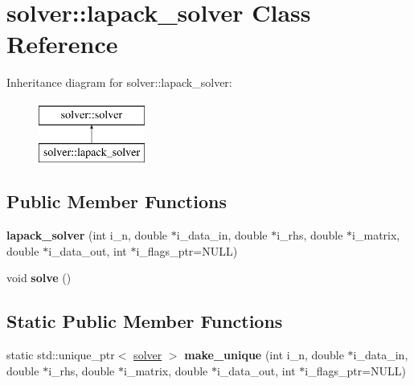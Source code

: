 \hypertarget{classsolver_1_1lapack__solver}{\section{solver\-:\-:lapack\-\_\-solver Class Reference}
\label{classsolver_1_1lapack__solver}
}
Inheritance diagram for solver\-:\-:lapack\-\_\-solver\-:\begin{figure}[H]
\begin{center}
\leavevmode
\includegraphics[height=2.000000cm]{classsolver_1_1lapack__solver}
\end{center}
\end{figure}
\subsection*{Public Member Functions}
\begin{DoxyCompactItemize}
\item 
\hypertarget{classsolver_1_1lapack__solver_a63feb494ddb6c96efcc683e0a3b865f8}{{\bfseries lapack\-\_\-solver} (int i\-\_\-n, double $\ast$i\-\_\-data\-\_\-in, double $\ast$i\-\_\-rhs, double $\ast$i\-\_\-matrix, double $\ast$i\-\_\-data\-\_\-out, int $\ast$i\-\_\-flags\-\_\-ptr=N\-U\-L\-L)}\label{classsolver_1_1lapack__solver_a63feb494ddb6c96efcc683e0a3b865f8}

\item 
\hypertarget{classsolver_1_1lapack__solver_a9b9c2125f777687b57798b9c7ead2d8d}{void {\bfseries solve} ()}\label{classsolver_1_1lapack__solver_a9b9c2125f777687b57798b9c7ead2d8d}

\end{DoxyCompactItemize}
\subsection*{Static Public Member Functions}
\begin{DoxyCompactItemize}
\item 
\hypertarget{classsolver_1_1lapack__solver_a27f538242ca76b286eb5eed2cc6556b8}{static std\-::unique\-\_\-ptr$<$ \hyperlink{classsolver_1_1solver}{solver} $>$ {\bfseries make\-\_\-unique} (int i\-\_\-n, double $\ast$i\-\_\-data\-\_\-in, double $\ast$i\-\_\-rhs, double $\ast$i\-\_\-matrix, double $\ast$i\-\_\-data\-\_\-out, int $\ast$i\-\_\-flags\-\_\-ptr=N\-U\-L\-L)}\label{classsolver_1_1lapack__solver_a27f538242ca76b286eb5eed2cc6556b8}

\end{DoxyCompactItemize}


